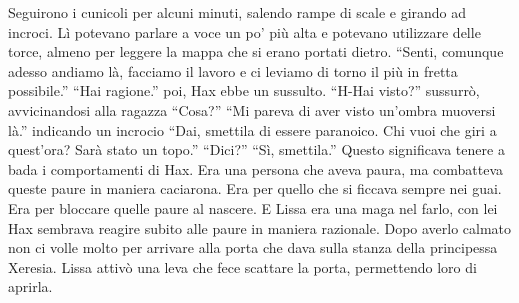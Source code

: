     Seguirono i cunicoli per alcuni minuti, salendo rampe di scale e
    girando ad incroci. Lì potevano parlare a voce un po' più alta e
    potevano utilizzare delle torce, almeno per leggere la mappa che si
    erano portati dietro. ``Senti, comunque adesso andiamo là, facciamo il
    lavoro e ci leviamo di torno il più in fretta possibile.'' ``Hai
    ragione.'' poi, Hax ebbe un sussulto. ``H-Hai visto?'' sussurrò,
    avvicinandosi alla ragazza ``Cosa?'' ``Mi pareva di aver visto un'ombra
    muoversi là.'' indicando un incrocio ``Dai, smettila di essere
    paranoico. Chi vuoi che giri a quest'ora? Sarà stato un topo.''
    ``Dici?'' ``Sì, smettila.'' Questo significava tenere a bada i
    comportamenti di Hax. Era una persona che aveva paura, ma combatteva
    queste paure in maniera caciarona. Era per quello che si ficcava sempre
    nei guai. Era per bloccare quelle paure al nascere. E Lissa era una
    maga nel farlo, con lei Hax sembrava reagire subito alle paure in
    maniera razionale. Dopo averlo calmato non ci volle molto per arrivare
    alla porta che dava sulla stanza della principessa Xeresia. Lissa
    attivò una leva che fece scattare la porta, permettendo loro di
    aprirla.
    
